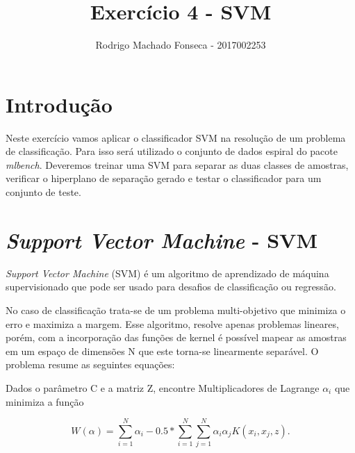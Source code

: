 \documentclass[12pt]{article}
\begin{document}

\pagestyle{fancy}
\fancyhf{}
\renewcommand{\headrulewidth}{0.4pt}
\fancyfoot[C]{\thepage}
\renewcommand{\footrulewidth}{0.4pt}
\fancyfoot[C]{\thepage}
\title{\LARGE \bf
 Exercício 4 - SVM}
\author{ Rodrigo Machado Fonseca - 2017002253}
\thispagestyle{fancy}
\maketitle
\thispagestyle{fancy}

\section{Introdução}

  \par Neste exercício vamos aplicar o classificador SVM na resolução de um problema de classificação. Para isso será utilizado o conjunto de dados espiral do pacote \textit{mlbench}. Deveremos treinar uma SVM para separar as duas classes de amostras, verificar o hiperplano de separação gerado e testar o classificador para um conjunto de teste.
  
\section{\textit{Support Vector Machine} - SVM}
  
  \par \textit{Support Vector Machine} (SVM) é um algoritmo de aprendizado de máquina supervisionado que pode ser usado para desafios de classificação ou regressão.
  
  \par No caso de classificação trata-se de um problema multi-objetivo que minimiza o erro e maximiza a margem. Esse algoritmo, resolve apenas problemas lineares, porém, com a incorporação das funções de kernel é possível mapear as amostras em um espaço de dimensões N que este torna-se linearmente separável. O problema resume as seguintes equações:
  \begin{center}
    Dados o parâmetro C e a matriz Z, encontre Multiplicadores de Lagrange $\alpha_i$ que minimiza a função 
  \end{center}
  
  \begin{equation}
  W(\alpha) = \sum_{i=1}^{N}\alpha_i -0.5*\sum_{i=1}^{N}\sum_{j=1}^{N}\alpha_i\alpha_jK(x_i,x_j,z).
  \end{equation}
  
\end{document}
